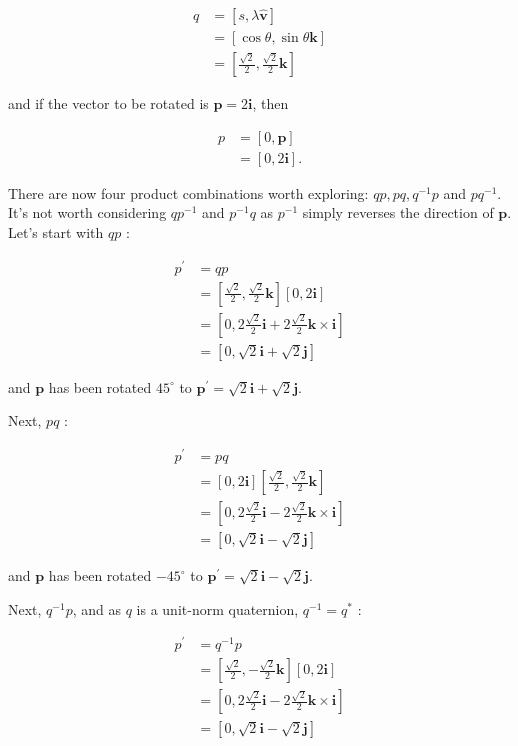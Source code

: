 $$
\begin{aligned}
q & =[s, \lambda \hat{\mathbf{v}}] \\
& =[\cos \theta, \sin \theta \mathbf{k}] \\
& =\left[\frac{\sqrt{2}}{2}, \frac{\sqrt{2}}{2} \mathbf{k}\right]
\end{aligned}
$$

and if the vector to be rotated is $\mathbf{p}=2 \mathbf{i}$, then

$$
\begin{aligned}
p & =[0, \mathbf{p}] \\
& =[0,2 \mathbf{i}] .
\end{aligned}
$$

There are now four product combinations worth exploring: $q p, p q, q^{-1} p$ and $p q^{-1}$. It's not worth considering $q p^{-1}$ and $p^{-1} q$ as $p^{-1}$ simply reverses the direction of $\mathbf{p}$. Let's start with $q p$ :

$$
\begin{aligned}
p^{\prime} & =q p \\
& =\left[\frac{\sqrt{2}}{2}, \frac{\sqrt{2}}{2} \mathbf{k}\right][0,2 \mathbf{i}] \\
& =\left[0,2 \frac{\sqrt{2}}{2} \mathbf{i}+2 \frac{\sqrt{2}}{2} \mathbf{k} \times \mathbf{i}\right] \\
& =[0, \sqrt{2} \mathbf{i}+\sqrt{2} \mathbf{j}]
\end{aligned}
$$

and $\mathbf{p}$ has been rotated $45^{\circ}$ to $\mathbf{p}^{\prime}=\sqrt{2} \mathbf{i}+\sqrt{2} \mathbf{j}$.

Next, $p q$ :

$$
\begin{aligned}
p^{\prime} & =p q \\
& =[0,2 \mathbf{i}]\left[\frac{\sqrt{2}}{2}, \frac{\sqrt{2}}{2} \mathbf{k}\right] \\
& =\left[0,2 \frac{\sqrt{2}}{2} \mathbf{i}-2 \frac{\sqrt{2}}{2} \mathbf{k} \times \mathbf{i}\right] \\
& =[0, \sqrt{2} \mathbf{i}-\sqrt{2} \mathbf{j}]
\end{aligned}
$$

and $\mathbf{p}$ has been rotated $-45^{\circ}$ to $\mathbf{p}^{\prime}=\sqrt{2} \mathbf{i}-\sqrt{2} \mathbf{j}$.

Next, $q^{-1} p$, and as $q$ is a unit-norm quaternion, $q^{-1}=q^{*}$ :

$$
\begin{aligned}
p^{\prime} & =q^{-1} p \\
& =\left[\frac{\sqrt{2}}{2},-\frac{\sqrt{2}}{2} \mathbf{k}\right][0,2 \mathbf{i}] \\
& =\left[0,2 \frac{\sqrt{2}}{2} \mathbf{i}-2 \frac{\sqrt{2}}{2} \mathbf{k} \times \mathbf{i}\right] \\
& =[0, \sqrt{2} \mathbf{i}-\sqrt{2} \mathbf{j}]
\end{aligned}
$$

